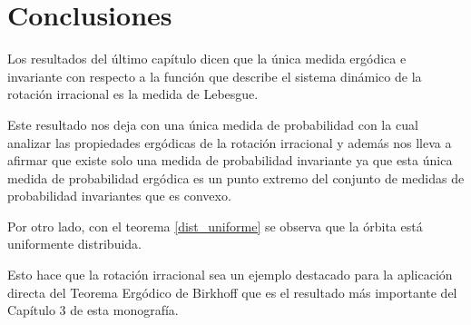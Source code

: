 \chapter*{Conclusiones}

Los resultados del último capítulo dicen que la única medida ergódica e invariante con respecto a la función que describe el sistema dinámico de la rotación irracional es la medida de Lebesgue.

Este resultado nos deja con una única medida de probabilidad con la cual analizar las propiedades ergódicas de la rotación irracional y además nos lleva a afirmar que existe solo una medida de probabilidad invariante ya que esta única medida de probabilidad ergódica es un punto extremo del conjunto de medidas de probabilidad invariantes que es convexo.

Por otro lado, con el teorema \ref{dist_uniforme} se observa que la órbita está uniformente distribuida.

Esto hace que la rotación irracional sea un ejemplo destacado para la aplicación directa del Teorema Ergódico de Birkhoff que es el resultado más importante del Capítulo 3 de esta monografía.